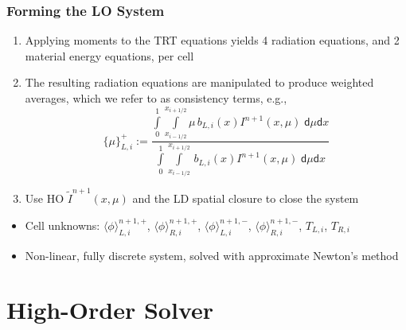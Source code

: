\documentclass[xcolor=dvipsnames,hyperref={pdfpagelabels=false},unknownkeysallowed]{beamer}
\newcommand{\colb}[1]{{\color{blue} #1}}
\newlength{\wideitemsep}
\let\olditem\item
\renewcommand{\item}{\setlength{\itemsep}{\wideitemsep}\olditem}
\renewcommand{\d}{\mathsf{d}}
\newcommand{\mom}[1]{\langle #1 \rangle}
\newcommand{\xl}{{x_{i-1/2}}}
\newcommand{\xr}{{x_{i+1/2}}}
\begin{document}
\begin{frame}
    \frametitle{Forming the LO System}
    \vspace{-0.1in}
    {\small
    \begin{enumerate}
      \item Applying moments to the TRT equations yields 4 radiation equations, and 2 material energy
        equations, per cell
    \item The resulting radiation equations are  manipulated to produce weighted
        averages, which we refer to as \colb{consistency
          terms}, e.g.,
    \begin{equation*}
\{{\mu}\}_{L,i}^{+} := \frac{\displaystyle 
    \int\limits_0^1 \int\limits_\xl^\xr \mu \, b_{L,i}(x) 
I^{n+1}(x,\mu) \;\d \mu \d x } 
{\displaystyle \int\limits_0^1 \int\limits_\xl^\xr \, b_{L,i}(x)
I^{n+1}(x,\mu)\; \d \mu \d x } 
    \end{equation*}
\item Use HO $\tilde{I}^{n+1}(x,\mu)$ and the LD spatial closure to close the system
    \end{enumerate}
    \begin{itemize}
            \pause
    \item Cell unknowns: $\mom{\phi}_{L,i}^{n+1,+}$, $\mom{\phi}_{R,i}^{n+1,+}$,
        $\mom{\phi}_{L,i}^{n+1,-}$, $\mom{\phi}_{R,i}^{n+1,-}$, $T_{L,i}$, $T_{R,i}$

        \pause
     \item Non-linear, fully discrete system, solved with approximate Newton's method
 \end{itemize}


}
\end{frame}



\section{High-Order Solver}
\subsection{}
\end{document}
